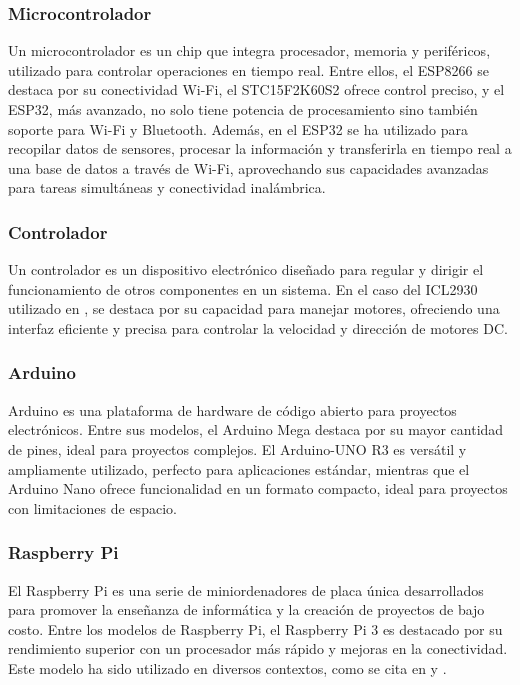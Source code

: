 \subsubsection*{Microcontrolador}
Un microcontrolador es un chip que integra procesador, memoria y periféricos, utilizado para controlar operaciones en tiempo real. Entre ellos, el ESP8266 se destaca por su conectividad Wi-Fi, el STC15F2K60S2 ofrece control preciso, y el ESP32, más avanzado, no solo tiene potencia de procesamiento sino también soporte para Wi-Fi y Bluetooth. Además, en \cite{ramos_galindo_diseno_2023} el ESP32 se ha utilizado para recopilar datos de sensores, procesar la información y transferirla en tiempo real a una base de datos a través de Wi-Fi, aprovechando sus capacidades avanzadas para tareas simultáneas y conectividad inalámbrica.

\subsubsection*{Controlador}
Un controlador es un dispositivo electrónico diseñado para regular y dirigir el funcionamiento de otros componentes en un sistema. En el caso del ICL2930 utilizado en \cite{hasan_implementation_2018}, se destaca por su capacidad para manejar motores, ofreciendo una interfaz eficiente y precisa para controlar la velocidad y dirección de motores DC.

\subsubsection*{Arduino}
Arduino es una plataforma de hardware de código abierto para proyectos electrónicos. Entre sus modelos, el Arduino Mega destaca por su mayor cantidad de pines, ideal para proyectos complejos. El Arduino-UNO R3 es versátil y ampliamente utilizado, perfecto para aplicaciones estándar, mientras que el Arduino Nano ofrece funcionalidad en un formato compacto, ideal para proyectos con limitaciones de espacio.

\subsubsection*{Raspberry Pi}
El Raspberry Pi es una serie de miniordenadores de placa única desarrollados para promover la enseñanza de informática y la creación de proyectos de bajo costo. Entre los modelos de Raspberry Pi, el Raspberry Pi 3 es destacado por su rendimiento superior con un procesador más rápido y mejoras en la conectividad. Este modelo ha sido utilizado en diversos contextos, como se cita en \cite{benyezza_zoning_2021} y \cite{orozco_jaramillo_diseno_2019}.

